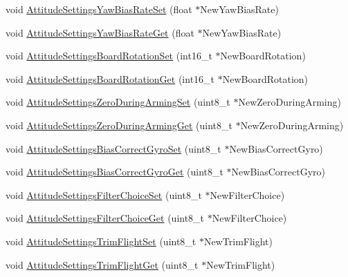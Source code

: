 \begin{DoxyCompactItemize}
void \hyperlink{group___attitude_settings_ga39c1ed0f527875f9181aeeef50670661}{\-Attitude\-Settings\-Yaw\-Bias\-Rate\-Set} (float $\ast$\-New\-Yaw\-Bias\-Rate)
\item 
void \hyperlink{group___attitude_settings_gad90e1fa07480f8e15a47444133983789}{\-Attitude\-Settings\-Yaw\-Bias\-Rate\-Get} (float $\ast$\-New\-Yaw\-Bias\-Rate)
\item 
void \hyperlink{group___attitude_settings_gada7dec05f7e8013d40e2b68b84aa217d}{\-Attitude\-Settings\-Board\-Rotation\-Set} (int16\-\_\-t $\ast$\-New\-Board\-Rotation)
\item 
void \hyperlink{group___attitude_settings_ga3b9d4b0e5268b49d3f1c0bd54695bffe}{\-Attitude\-Settings\-Board\-Rotation\-Get} (int16\-\_\-t $\ast$\-New\-Board\-Rotation)
\item 
void \hyperlink{group___attitude_settings_ga5dcffd63e644c6839d2e6b33e1bcda19}{\-Attitude\-Settings\-Zero\-During\-Arming\-Set} (uint8\-\_\-t $\ast$\-New\-Zero\-During\-Arming)
\item 
void \hyperlink{group___attitude_settings_ga8721e931a117cf6042e651817adcd86f}{\-Attitude\-Settings\-Zero\-During\-Arming\-Get} (uint8\-\_\-t $\ast$\-New\-Zero\-During\-Arming)
\item 
void \hyperlink{group___attitude_settings_ga634ee564984ef9124bb8264d0e76ba96}{\-Attitude\-Settings\-Bias\-Correct\-Gyro\-Set} (uint8\-\_\-t $\ast$\-New\-Bias\-Correct\-Gyro)
\item 
void \hyperlink{group___attitude_settings_gadb72bdfc3888db89c39e5738e64cc1ce}{\-Attitude\-Settings\-Bias\-Correct\-Gyro\-Get} (uint8\-\_\-t $\ast$\-New\-Bias\-Correct\-Gyro)
\item 
void \hyperlink{group___attitude_settings_ga8c521fe5c4556011e69f875987976f9b}{\-Attitude\-Settings\-Filter\-Choice\-Set} (uint8\-\_\-t $\ast$\-New\-Filter\-Choice)
\item 
void \hyperlink{group___attitude_settings_gaa235663099cf8948de6ae6ef106e3096}{\-Attitude\-Settings\-Filter\-Choice\-Get} (uint8\-\_\-t $\ast$\-New\-Filter\-Choice)
\item 
void \hyperlink{group___attitude_settings_gace499cc512be0afc44f5de29f5de080b}{\-Attitude\-Settings\-Trim\-Flight\-Set} (uint8\-\_\-t $\ast$\-New\-Trim\-Flight)
\item 
void \hyperlink{group___attitude_settings_gac6b3994070f7cbea5fa1ea5d08a4b5ad}{\-Attitude\-Settings\-Trim\-Flight\-Get} (uint8\-\_\-t $\ast$\-New\-Trim\-Flight)
\end{DoxyCompactItemize}


